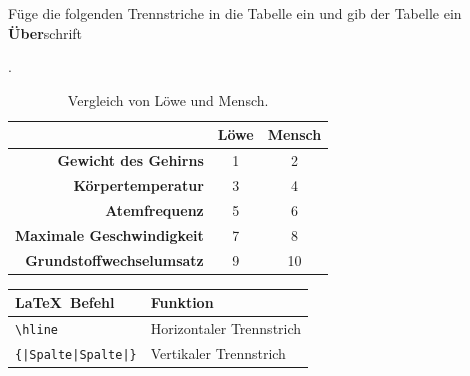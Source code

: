\documentclass["WS\space 16-17\space -\space LaTeX-Kurs\space -\space Praesentation\space -\space 2.tex"]{subfiles}
\begin{document}
\begin{frame}[fragile]
	\Aufgabee
		Füge die folgenden Trennstriche in die Tabelle ein und gib der Tabelle ein \textbf{Über}schrift
        
        \textrm{}.
	\begin{outputbox}
		\vspace{-0.4cm}
		\begin{center}
            \begin{table}[htbp]
                \centering
            	\caption{Vergleich von Löwe und Mensch.}
                \vspace{-0.4cm}
            	\begin{tabular}{r|cc}
            		\hline 
            		\textbf{} & \textbf{Löwe} & \textbf{Mensch} \\ \hline  
            		\textbf{Gewicht des Gehirns} & 1 & 2 \\  
            		\textbf{Körpertemperatur} & 3 & 4 \\  
            		\textbf{Atemfrequenz} & 5 & 6 \\ 
            		\textbf{Maximale Geschwindigkeit} & 7 & 8 \\  
            		\textbf{Grundstoffwechselumsatz} & 9 & 10 \\ \hline
            	\end{tabular} 
            	\label{}
            \end{table}
		\end{center}
		\vspace{-0.2cm}
	\end{outputbox}
	
	\btVFill\Befehle
	\begin{center}
		\begin{tabular}{ll}
			\toprule
			\LaTeX\ Befehl								&	Funktion								\\ \midrule
			\lstinline|\hline|							&	Horizontaler Trennstrich				\\
			\lstinline/{|Spalte|Spalte|}/				&	Vertikaler Trennstrich    				\\
			\bottomrule
		\end{tabular}
	\end{center}
	\vspace{0.1cm}
\end{frame}
\end{document}
